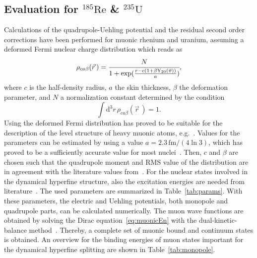\subsection{Evaluation for $^{185}\text{Re}$ \& $^{235}\text{U}$}
Calculations of the quadrupole-Uehling potential and the residual second order corrections have been performed for muonic rhenium and uranium, assuming a deformed Fermi nuclear charge distribution which reads as
\begin{equation}
\rho_{ca\beta}(\vec{r}\,)=\cfrac{N}{1+\exp (\frac{r-c(1+\beta \text{Y}_{20}(\vartheta))}{a})},
\label{eq:deffermi_2}
\end{equation}
where $c$ is the half-density radius, $a$ the skin thickness, $\beta$ the deformation parameter, and $N$ a normalization constant determined by the condition
\begin{equation}
\int \text{d}^3r\, \rho_{ca\beta}(\vec{r}\,)=1.
\end{equation}
Using the deformed Fermi distribution has proved to be suitable for the description of the level structure of heavy muonic atoms, e.g.~\cite{hitlin1970,tanaka1984,tanaka1984_2}.
Values for the parameters can be estimated by using a value ${a}{=}{2.3\,\text{fm}/(4\ln 3)}$, which has proved to be a sufficiently accurate value for most nuclei~\cite{Beier2000}. Then, $c$ and $\beta$ are chosen such that the quadrupole moment and RMS value of the distribution are in agreement with the literature values from~\cite{Angeli2013,Stone2005}. For the nuclear states involved in the dynamical hyperfine structure, also the excitation energies are needed from literature~\cite{ENSDF}. The used parameters are summarized in Table~\ref{tab:params}.
With these parameters, the electric and Uehling potentials, both monopole and quadrupole parts, can be calculated numerically. The muon wave functions are obtained by solving the Dirac equation~\eqref{eq:muonicEn} with the dual-kinetic-balance method~\cite{Shabaev2004}. Thereby, a complete set of muonic bound and continuum states is obtained. An overview for the binding energies of muon states important for the dynamical hyperfine splitting are shown in Table~\ref{tab:monopole}.

